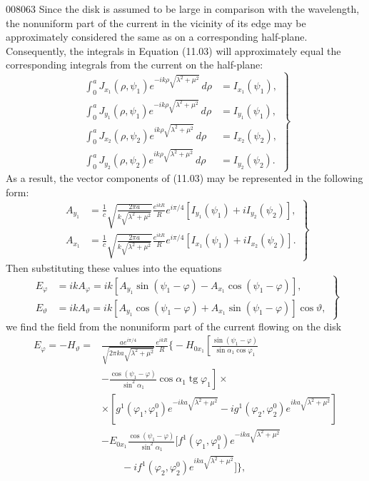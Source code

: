 \begin{scanpage}{0080}{63}
Since the disk is assumed to be large in comparison with the wavelength, the nonuniform part of the current in the vicinity of its edge may be approximately considered the same as on a corresponding half-plane. Consequently, the integrals in Equation (11.03) will approximately equal the corresponding integrals from the current on the half-plane:
\[
\left.\begin{aligned}
\int_0^a J_{x_1}(\rho,\psi_1)e^{-ik\rho\sqrt{\lambda^2+\mu^2}}\,d\rho&=I_{x_1}(\psi_1),\\
\int_0^a J_{y_1}(\rho,\psi_1)e^{-ik\rho\sqrt{\lambda^2+\mu^2}}\,d\rho&=I_{y_1}(\psi_1),\\
\int_0^a J_{x_2}(\rho,\psi_2)e^{ik\rho\sqrt{\lambda^2+\mu^2}}\,d\rho&=I_{x_2}(\psi_2),\\
\int_0^a J_{y_2}(\rho,\psi_2)e^{ik\rho\sqrt{\lambda^2+\mu^2}}\,d\rho&=I_{y_2}(\psi_2).
\end{aligned}\right\}\tag{11.27}
\]
As a result, the vector components of (11.03) may be represented in the following form:
\[
\left.\begin{aligned}
A_{y_1}&=\frac1c\sqrt{\frac{2\pi a}{k\sqrt{\lambda^2+\mu^2}}}\frac{e^{ikR}}R e^{i\pi/4}[I_{y_1}(\psi_1)+iI_{y_2}(\psi_2)],\\
A_{x_1}&=\frac1c\sqrt{\frac{2\pi a}{k\sqrt{\lambda^2+\mu^2}}}\frac{e^{ikR}}R e^{i\pi/4}[I_{x_1}(\psi_1)+iI_{x_2}(\psi_2)].
\end{aligned}\right\}\tag{11.28}
\]
Then substituting these values into the equations
\[
\left.\begin{aligned}
E_\varphi&=ik A_\varphi=ik[A_{y_1}\sin(\psi_1-\varphi)-A_{x_1}\cos(\psi_1-\varphi)],\\
E_\vartheta&=ik A_\vartheta=ik[A_{y_1}\cos(\psi_1-\varphi)+A_{x_1}\sin(\psi_1-\varphi)]\cos\vartheta,
\end{aligned}\right\}\tag{11.29}
\]
we find the field from the nonuniform part of the current flowing on the disk
\[
\begin{aligned}
E_\varphi=-H_\vartheta={}&\frac{ae^{i\pi/4}}{\sqrt{2\pi ka\sqrt{\lambda^2+\mu^2}}}\frac{e^{ikR}}R\biggl\{-H_{0x_1}\left[\frac{\sin(\psi_1-\varphi)}{\sin\alpha_1\cos\varphi_1}\right.\\
&\left.-\frac{\cos(\psi_1-\varphi)}{\sin^2\alpha_1}\cos\alpha_1\operatorname{tg}\varphi_1\right]\times\\
&\times[g^1(\varphi_1,\varphi_1^0)e^{-ika\sqrt{\lambda^2+\mu^2}}-ig^1(\varphi_2,\varphi_2^0)e^{ika\sqrt{\lambda^2+\mu^2}}]\\
&-E_{0x_1}\frac{\cos(\psi_1-\varphi)}{\sin^2\alpha_1}[f^1(\varphi_1,\varphi_1^0)e^{-ika\sqrt{\lambda^2+\mu^2}}\\
&\qquad-if^1(\varphi_2,\varphi_2^0)e^{ika\sqrt{\lambda^2+\mu^2}}]\biggr\},
\end{aligned}\tag{11.30}
\]
\end{scanpage}
